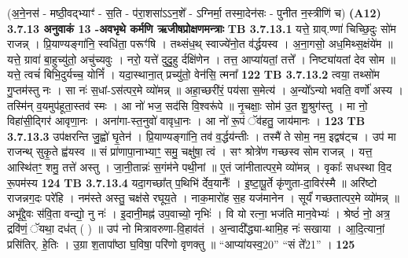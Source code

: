 \documentclass[17pt]{extarticle}
\begin{document}
{{{{{{{{{{{{{{{{{{{                                (अ॒ने॒नस॑ - मष्ठी॒वद्भ्याꣳ॑ - स॒ति - प॑रा॒शसा॑ऽऽन॒शे᳚ - ऽग्निर्मा॒ तस्मा॒देन॑सः - पुनीत न॒स्त्रीणि॑ च) \textbf{(A12)} \newline \newline
                \textbf{ 3.7.13    अनुवाकं   13 -अवभृथे कर्मणि ऋजीषप्रोक्षणमन्त्राः} \newline
                                \textbf{ TB 3.7.13.1} \newline
                  यत्ते॒ ग्राव्.ण्णा॑ चिच्छि॒दुः सो॑म राजन्न् । प्रि॒याण्यङ्गा॑नि॒ स्वधि॑ता॒ परूꣳ॑षि । तथ्संध॒थ् स्वाज्ये॑नो॒त व॑र्द्धयस्व । अ॒ना॒गसो॒ अध॒मिथ्स॒क्षंये॑म ॥ यत्ते॒ ग्रावा॑ बा॒हुच्यु॑तो॒ अचु॑च्यवुः । नरो॒ यत्ते॑ दुदु॒हु र्दक्षि॑णेन । तत्त॒ आप्या॑यतां॒ तत्ते᳚ । निष्ट्या॑यतां देव सोम ॥ यत्ते॒ त्वचं॑ बिभि॒दुर्यच्च॒ योनिं᳚ । यदा॒स्थाना॒त् प्रच्यु॑तो॒ वेन॑सि॒ त्मना᳚ \textbf{ 122} \newline
                  \newline
                                \textbf{ TB 3.7.13.2} \newline
                  त्वया॒ तथ्सो॑म गु॒प्तम॑स्तु नः । सा नः॑ स॒धां-ऽस॑त्पर॒मे व्यो॑मन्न् ॥ अहा॒च्छरी॑रं॒ पय॑सा स॒मेत्य॑ । अ॒न्यो᳚ऽन्यो भवति॒ वर्णो॑ अस्य । तस्मि॑न् व॒यमुप॑हूता॒स्तव॑ स्मः । आ नो॑ भज॒ सद॑सि वि॒श्वरू॑पे ॥ नृ॒चक्षाः॒ सोम॑ उ॒त शु॒श्रुग॑स्तु । मा नो॒ विहा॑सी॒द्गिर॑ आवृणा॒नः । अना॑गा-स्त॒नुवो॑ वावृधा॒नः । आ नो॑ रू॒पं ॅव॑हतु॒ जाय॑मानः । \textbf{ 123} \newline
                  \newline
                                \textbf{ TB 3.7.13.3} \newline
                  उप॑क्षरन्ति जु॒ह्वो॑ घृ॒तेन॑ । प्रि॒याण्यङ्गा॑नि॒ तव॑ व॒र्द्धय॑न्तीः । तस्मै॑ ते सोम॒ नम॒ इद्वष॑ट्च । उप॑ मा राजन्थ् सुकृ॒ते ह्व॑यस्व ॥ सं प्रा॑णापा॒नाभ्याꣳ॒॒ समु॒ चक्षु॑षा॒ त्वं । सꣳ श्रोत्रे॑ण गच्छस्व सोम राजन्न् । यत्त॒ आस्थि॑तꣳ॒॒ शमु॒ तत्ते॑ अस्तु । जा॒नी॒तान्नः॑ स॒गंम॑ने पथी॒नां ॥ ए॒तं जा॑नीतात्पर॒मे व्यो॑मन्न् । वृकाः᳚ सधस्था वि॒द रू॒पम॑स्य \textbf{ 124} \newline
                  \newline
                                \textbf{ TB 3.7.13.4} \newline
                  यदा॒गच्छा᳚त् प॒थिभि॑ र्देव॒यानैः᳚ । इ॒ष्टा॒पू॒र्ते कृ॑णुता-दा॒विर॑स्मै ॥ अरि॑ष्टो राजन्नग॒दः परे॑हि । नम॑स्ते अस्तु॒ चक्ष॑से रघूय॒ते । नाक॒मारो॑ह स॒ह यज॑मानेन । सूर्यं॑ गच्छतात्पर॒मे व्यो॑मन्न् ॥ अभू᳚द्दे॒वः स॑वि॒ता वन्द्यो॒ नु नः॑ । इ॒दानी॒मह्न॑ उप॒वाच्यो॒ नृभिः॑ । वि यो रत्ना॒ भज॑ति मान॒वेभ्यः॑ । श्रेष्ठं॑ नो॒ अत्र॒ द्रवि॑णं॒ ॅयथा॒ दध॑त् ( ) ॥ उप॑ नो मित्रावरुणा-वि॒हाव॑तं । अ॒न्वादी᳚द्ध्या-थामि॒ह नः॑ सखाया । आ॒दि॒त्यानां॒ प्रसि॑तिर्. हे॒तिः । उ॒ग्रा श॒तापा᳚ष्ठा घ॒विषा॒ परि॑णो वृणक्तु ॥ “आप्या॑यस्व॒{20}” “सं ते᳚{21}” । \textbf{ 125} \newline
}}}}}}}}}}}}}}}}}}}
\end{document}
